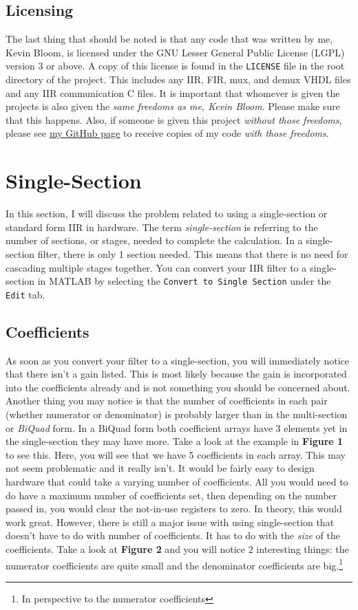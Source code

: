 \documentclass[12pt,a4paper,titlepage]{article}
\begin{document}
\subsection{Licensing}
The last thing that should be noted is that any code that was written by me,
Kevin Bloom, is licensed under the GNU Lesser General Public License (LGPL)
version 3 or above. A copy of this license is found in the \texttt{LICENSE} file
in the root directory of the project. This includes any IIR, FIR, mux, and demux
VHDL files and any IIR communication C files. It is important that whomever is
given the projects is also given the \emph{same freedoms as me, Kevin
  Bloom}. Please make sure that this happens. Also, if someone is given this
project \emph{without those freedoms}, please see
\underline{\href{https://github.com/nuclearkev/iir-hardware}{my GitHub page}} to
receive copies of my code \emph{with those freedoms}.


\section{Single-Section}
In this section, I will discuss the problem related to using a single-section or
standard form IIR in hardware. The term \emph{single-section} is referring to
the number of sections, or stages, needed to complete the calculation. In a
single-section filter, there is only 1 section needed. This means that there is
no need for cascading multiple stages together. You can convert your IIR filter
to a single-section in MATLAB by selecting the \texttt{Convert to Single
  Section} under the \texttt{Edit} tab.

\subsection{Coefficients}
As soon as you convert your filter to a single-section, you will immediately
notice that there isn't a gain listed. This is most likely because the gain is
incorporated into the coefficients already and is not something you should be
concerned about. Another thing you may notice is that the number of coefficients
in each pair (whether numerator or denominator) is probably larger than in the
multi-section or \emph{BiQuad} form. In a BiQuad form both coefficient arrays
have 3 elements yet in the single-section they may have more. Take a look at the
example in \textbf{Figure 1} to see this. Here, you will see that we have 5
coefficients in each array. This may not seem problematic and it really
isn't. It would be fairly easy to design hardware that could take a varying
number of coefficients. All you would need to do have a maximum number of
coefficients set, then depending on the number passed in, you would clear the
not-in-use registers to zero. In theory, this would work great. However, there
is still a major issue with using single-section that doesn't have to do with
number of coefficients. It has to do with the \emph{size} of the
coefficients. Take a look at \textbf{Figure 2} and you will notice 2 interesting
things: the numerator coefficients are quite small and the denominator
coefficients are big.\footnote{In perspective to the numerator coefficients}
\end{document}
